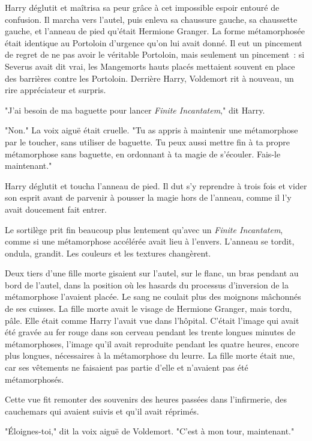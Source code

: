 Harry déglutit et maîtrisa sa peur grâce à cet impossible espoir entouré de confusion. Il marcha vers l'autel, puis enleva sa chaussure gauche, sa chaussette gauche, et l'anneau de pied qu'était Hermione Granger. La forme métamorphosée était identique au Portoloin d'urgence qu'on lui avait donné. Il eut un pincement de regret de ne pas avoir le véritable Portoloin, mais seulement un pincement~: si Severus avait dit vrai, les Mangemorts hauts placés mettaient souvent en place des barrières contre les Portoloin. Derrière Harry, Voldemort rit à nouveau, un rire appréciateur et surpris.

"J'ai besoin de ma baguette pour lancer \emph{Finite Incantatem}," dit Harry.

"Non." La voix aiguë était cruelle. "Tu as appris à maintenir une métamorphose par le toucher, sans utiliser de baguette. Tu peux aussi mettre fin à ta propre métamorphose sans baguette, en ordonnant à ta magie de s'écouler. Fais-le maintenant."

Harry déglutit et toucha l'anneau de pied. Il dut s'y reprendre à trois fois et vider son esprit avant de parvenir à pousser la magie hors de l'anneau, comme il l'y avait doucement fait entrer.

Le sortilège prit fin beaucoup plus lentement qu'avec un \emph{Finite Incantatem}, comme si une métamorphose accélérée avait lieu à l'envers. L'anneau se tordit, ondula, grandit. Les couleurs et les textures changèrent.

Deux tiers d'une fille morte gisaient sur l'autel, sur le flanc, un bras pendant au bord de l'autel, dans la position où les hasards du processus d'inversion de la métamorphose l'avaient placée. Le sang ne coulait plus des moignons mâchonnés de ses cuisses. La fille morte avait le visage de Hermione Granger, mais tordu, pâle. Elle était comme Harry l'avait vue dans l'hôpital. C'était l'image qui avait été gravée au fer rouge dans son cerveau pendant les trente longues minutes de métamorphoses, l'image qu'il avait reproduite pendant les quatre heures, encore plus longues, nécessaires à la métamorphose du leurre. La fille morte était nue, car ses vêtements ne faisaient pas partie d'elle et n'avaient pas été métamorphosés.

Cette vue fit remonter des souvenirs des heures passées dans l'infirmerie, des cauchemars qui avaient suivis et qu'il avait réprimés.

"Éloignes-toi," dit la voix aiguë de Voldemort. "C'est à mon tour, maintenant."

